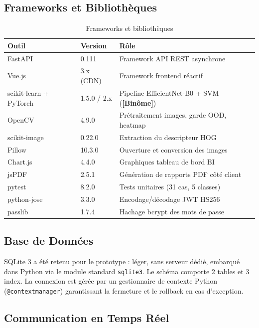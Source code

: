 \documentclass[12pt, a4paper]{report}
\newcommand{\binpart}{\textbf{[Binôme]}}
\begin{document}
\subsection{Frameworks et Bibliothèques}

\begin{table}[H]
\centering
\caption{Frameworks et bibliothèques}
\begin{tabularx}{\textwidth}{L{3cm} L{2.5cm} X}
\toprule
\textbf{Outil} & \textbf{Version} & \textbf{Rôle} \\
\midrule
FastAPI   & 0.111 & Framework API REST asynchrone \\
Vue.js    & 3.x (CDN) & Framework frontend réactif \\
scikit-learn + PyTorch & 1.5.0 / 2.x & Pipeline EfficientNet-B0 + SVM (\binpart) \\
OpenCV    & 4.9.0 & Prétraitement images, garde OOD, heatmap \\
scikit-image & 0.22.0 & Extraction du descripteur HOG \\
Pillow    & 10.3.0 & Ouverture et conversion des images \\
Chart.js  & 4.4.0 & Graphiques tableau de bord BI \\
jsPDF     & 2.5.1 & Génération de rapports PDF côté client \\
pytest    & 8.2.0 & Tests unitaires (31 cas, 5 classes) \\
python-jose & 3.3.0 & Encodage/décodage JWT HS256 \\
passlib   & 1.7.4 & Hachage bcrypt des mots de passe \\
\bottomrule
\end{tabularx}
\end{table}

\subsection{Base de Données}

SQLite 3 a été retenu pour le prototype : léger, sans serveur dédié,
embarqué dans Python via le module standard \texttt{sqlite3}.
Le schéma comporte 2 tables et 3 index. La connexion est gérée
par un gestionnaire de contexte Python (\texttt{@contextmanager})
garantissant la fermeture et le rollback en cas d'exception.

\subsection{Communication en Temps Réel}
\end{document}

